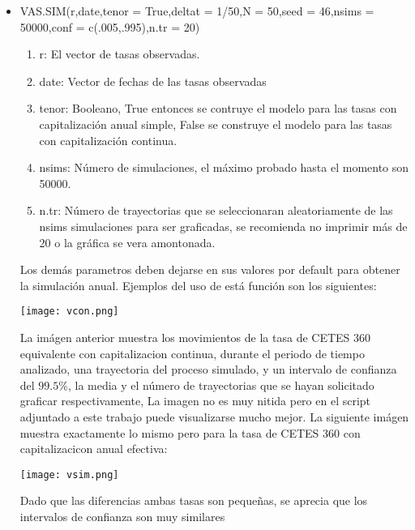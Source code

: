 \documentclass[11pt,notitlepage]{article}
\begin{document}
\begin{itemize}
    \item VAS.SIM(r,date,tenor = True,deltat = 1/50,N = 50,seed = 46,nsims = 50000,conf = c(.005,.995),n.tr = 20)
            \begin{enumerate}
                \item r: El vector de tasas observadas. 
                \item date: Vector de fechas de las tasas observadas
                \item tenor: Booleano, True entonces se contruye el modelo para las tasas con capitalización anual simple, False se construye el modelo para las tasas con capitalización continua. 
                \item nsims: Número de simulaciones, el máximo probado hasta el momento son 50000.
                \item n.tr: Número de trayectorias que se seleccionaran aleatoriamente de las nsims simulaciones para ser graficadas, 
                se recomienda no imprimir más de 20 o la gráfica se vera amontonada.
            \end{enumerate}
    Los demás parametros deben dejarse en sus valores por default para obtener la simulación anual. Ejemplos del uso de está función son los siguientes: 
    \begin{center}
       \texttt{[image: vcon.png]} 
    \end{center}
    La imágen anterior muestra los movimientos de la tasa de CETES 360 equivalente con capitalizacion continua, durante el periodo de tiempo analizado, una trayectoria del proceso simulado, y un intervalo de confianza del \(99.5\%\), la media y el número de trayectorias que se hayan solicitado graficar respectivamente, La imagen no es muy nitida pero en el script adjuntado a este trabajo puede visualizarse mucho mejor. %
    La siguiente imágen muestra exactamente lo mismo pero para la tasa de CETES 360 con capitalizacicon anual efectiva: 
    \begin{center}
       \texttt{[image: vsim.png]} 
    \end{center}
    Dado que las diferencias ambas tasas son pequeñas, se aprecia que los intervalos de confianza son muy  similares 
    

\end{itemize}
\end{document}
